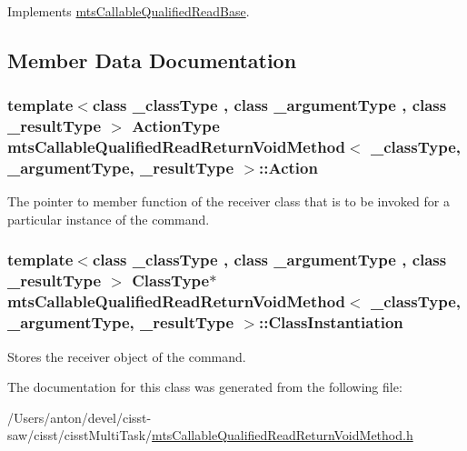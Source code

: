 Implements \hyperlink{classmts_callable_qualified_read_base_af01602ea4eb94bf074f6e44ff3db2737}{mts\+Callable\+Qualified\+Read\+Base}.



\subsection{Member Data Documentation}
\hypertarget{classmts_callable_qualified_read_return_void_method_ac7d58d66c42aa3c1071a121762b2d7fb}{}
\subsubsection[{Action}]{\setlength{\rightskip}{0pt plus 5cm}template$<$class \+\_\+class\+Type , class \+\_\+argument\+Type , class \+\_\+result\+Type $>$ {\bf Action\+Type} {\bf mts\+Callable\+Qualified\+Read\+Return\+Void\+Method}$<$ \+\_\+class\+Type, \+\_\+argument\+Type, \+\_\+result\+Type $>$\+::Action\hspace{0.3cm}{\ttfamily [protected]}}\label{classmts_callable_qualified_read_return_void_method_ac7d58d66c42aa3c1071a121762b2d7fb}
The pointer to member function of the receiver class that is to be invoked for a particular instance of the command. \hypertarget{classmts_callable_qualified_read_return_void_method_ace93cdd3d5c06f66479ab1e1cd29ece3}{}
\subsubsection[{Class\+Instantiation}]{\setlength{\rightskip}{0pt plus 5cm}template$<$class \+\_\+class\+Type , class \+\_\+argument\+Type , class \+\_\+result\+Type $>$ {\bf Class\+Type}$\ast$ {\bf mts\+Callable\+Qualified\+Read\+Return\+Void\+Method}$<$ \+\_\+class\+Type, \+\_\+argument\+Type, \+\_\+result\+Type $>$\+::Class\+Instantiation\hspace{0.3cm}{\ttfamily [protected]}}\label{classmts_callable_qualified_read_return_void_method_ace93cdd3d5c06f66479ab1e1cd29ece3}
Stores the receiver object of the command. 

The documentation for this class was generated from the following file\+:\begin{DoxyCompactItemize}
\item 
/\+Users/anton/devel/cisst-\/saw/cisst/cisst\+Multi\+Task/\hyperlink{mts_callable_qualified_read_return_void_method_8h}{mts\+Callable\+Qualified\+Read\+Return\+Void\+Method.\+h}\end{DoxyCompactItemize}
